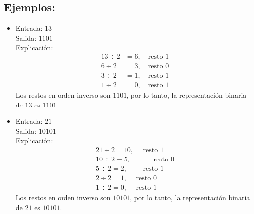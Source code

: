 \begin{enumerate}[label=\alph*)]
    \subsection*{Ejemplos:}
    \begin{itemize}
        \item Entrada: \( 13 \) \\
        Salida: \( \text{1101} \) \\
        Explicación:
        \[
        \begin{aligned}
        13 \div 2 &= 6, \quad \text{resto } 1 \\
        6 \div 2 &= 3, \quad \text{resto } 0 \\
        3 \div 2 &= 1, \quad \text{resto } 1 \\
        1 \div 2 &= 0, \quad \text{resto } 1
        \end{aligned}
        \]
        Los restos en orden inverso son \(1101\), por lo tanto, la representación binaria de \(13\) es \(1101\).

        \item Entrada: \( 21 \) \\
        Salida: \( \text{10101} \) \\
        Explicación:
        \[
        \begin{aligned}
        21 \div 2 = 10,\quad \text{ resto } 1 \\
        10 \div 2 = 5,\quad\quad\quad \text{ resto } 0 \\
        5 \div 2 = 2,\quad\quad \text{ resto } 1 \\
        2 \div 2 = 1,\quad \text{ resto } 0 \\
        1 \div 2 = 0,\quad \text{ resto } 1
        \end{aligned}
        \]
        Los restos en orden inverso son \(10101\), por lo tanto, la representación binaria de \(21\) es \(10101\).
    \end{itemize}
\end{enumerate}
